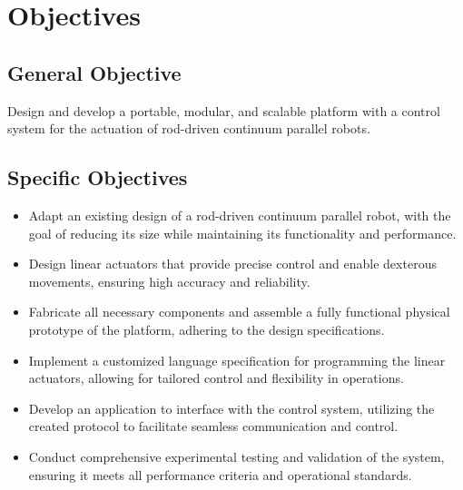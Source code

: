 \section{Objectives}

\subsection{General Objective}
Design and develop a portable, modular, and scalable platform with a control system for the actuation of rod-driven continuum parallel robots.

\subsection{Specific Objectives}
\begin{itemize}
    \item Adapt an existing design of a rod-driven continuum parallel robot, with the goal of reducing its size while maintaining its functionality and performance.
    \item Design linear actuators that provide precise control and enable dexterous movements, ensuring high accuracy and reliability.
    \item Fabricate all necessary components and assemble a fully functional physical prototype of the platform, adhering to the design specifications.
    \item Implement a customized language specification for programming the linear actuators, allowing for tailored control and flexibility in operations.
    \item Develop an application to interface with the control system, utilizing the created protocol to facilitate seamless communication and control.
    \item Conduct comprehensive experimental testing and validation of the system, ensuring it meets all performance criteria and operational standards.
\end{itemize}